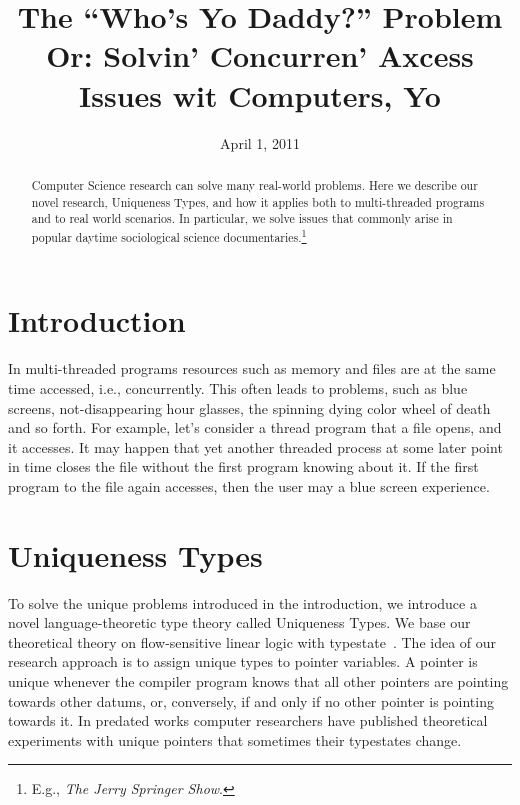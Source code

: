 \documentclass[nocopyrightspace,10pt]{sigplanconf}
\begin{document}
\title{The ``Who's Yo Daddy?'' Problem \\ \Large{Or: Solvin' Concurren' Axcess Issues wit Computers, Yo}}

           {}
           {}
           {}
           {}          
\date{April 1, 2011}

\maketitle

\pagestyle{empty}
\thispagestyle{empty}

\begin{abstract}
Computer Science research can solve many real-world problems. Here we describe our novel research, Uniqueness Types, and how it applies both to multi-threaded programs and to real world scenarios. In particular, we solve issues that commonly arise in popular daytime sociological science documentaries.\footnote{E.g., \emph{The Jerry Springer Show}.}
\end{abstract}

\section{Introduction}
In multi-threaded programs resources such as memory and files are at the same time accessed, i.e., concurrently. This often leads to problems, such as blue screens, not-disappearing hour glasses, the spinning dying color wheel of death and so forth. For example, let's consider a thread program that a file opens, and it accesses. It may happen that yet another threaded process at some later point in time closes the file without the first program knowing about it. If the first program to the file again accesses, then the user may a blue screen experience.

\section{Uniqueness Types}
To solve the unique problems introduced in the introduction, we introduce a novel language-theoretic type theory called Uniqueness Types. We base our theoretical theory on flow-sensitive linear logic with typestate~\cite{CMUwork}. The idea of our research approach is to assign unique types to pointer variables. A pointer is unique whenever the compiler program knows that all other pointers are pointing towards other datums, or, conversely, if and only if no other pointer is pointing towards it. In predated works computer researchers have published theoretical experiments with unique pointers that sometimes their typestates change.
\end{document}
